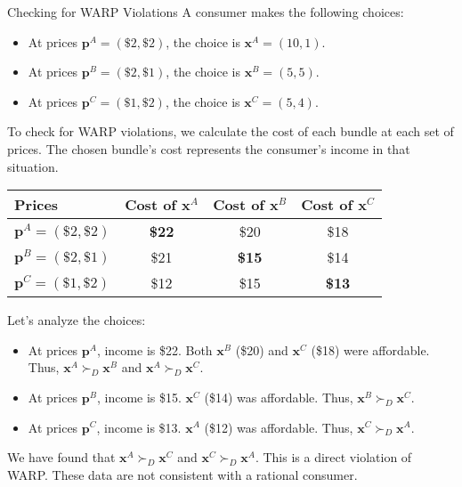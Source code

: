 \begin{examplebox}{Checking for WARP Violations}
A consumer makes the following choices:
\begin{itemize}
    \item At prices \(\mathbf{p}^A = (\$2, \$2)\), the choice is \(\mathbf{x}^A = (10, 1)\).
    \item At prices \(\mathbf{p}^B = (\$2, \$1)\), the choice is \(\mathbf{x}^B = (5, 5)\).
    \item At prices \(\mathbf{p}^C = (\$1, \$2)\), the choice is \(\mathbf{x}^C = (5, 4)\).
\end{itemize}
To check for WARP violations, we calculate the cost of each bundle at each set of prices. The chosen bundle's cost represents the consumer's income in that situation.

\begin{center}
\begin{tabular}{l|ccc}
\hline
\textbf{Prices} & \textbf{Cost of \(\mathbf{x}^A\)} & \textbf{Cost of \(\mathbf{x}^B\)} & \textbf{Cost of \(\mathbf{x}^C\)} \\
\hline
\(\mathbf{p}^A = (\$2, \$2)\) & \textbf{\$22} & \$20 & \$18 \\
\(\mathbf{p}^B = (\$2, \$1)\) & \$21 & \textbf{\$15} & \$14 \\
\(\mathbf{p}^C = (\$1, \$2)\) & \$12 & \$15 & \textbf{\$13} \\
\hline
\end{tabular}
\end{center}

Let's analyze the choices:
\begin{itemize}
    \item At prices \(\mathbf{p}^A\), income is \$22. Both \(\mathbf{x}^B\) (\$20) and \(\mathbf{x}^C\) (\$18) were affordable. Thus, \(\mathbf{x}^A \succ_D \mathbf{x}^B\) and \(\mathbf{x}^A \succ_D \mathbf{x}^C\).
    \item At prices \(\mathbf{p}^B\), income is \$15. \(\mathbf{x}^C\) (\$14) was affordable. Thus, \(\mathbf{x}^B \succ_D \mathbf{x}^C\).
    \item At prices \(\mathbf{p}^C\), income is \$13. \(\mathbf{x}^A\) (\$12) was affordable. Thus, \(\mathbf{x}^C \succ_D \mathbf{x}^A\).
\end{itemize}
We have found that \(\mathbf{x}^A \succ_D \mathbf{x}^C\) and \(\mathbf{x}^C \succ_D \mathbf{x}^A\). This is a direct violation of WARP. These data are not consistent with a rational consumer.
\end{examplebox}

